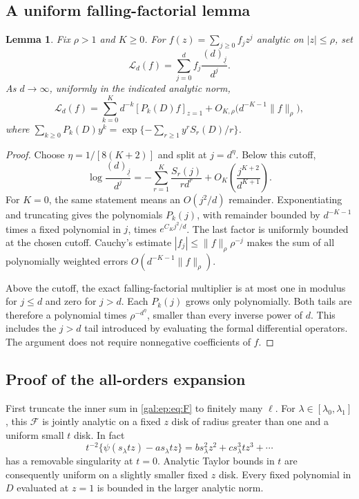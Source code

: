 \documentclass[11pt,letterpaper]{article}
\numberwithin{equation}{section}
\newtheorem{lemma}[theorem]{Lemma}
\theoremstyle{definition}\newtheorem{definition}[theorem]{Definition}
\theoremstyle{remark}\newtheorem{remark}[theorem]{Remark}
\newcommand{\fall}[2]{(#1)_{\underline{#2}}}
\begin{document}
\subsection{A uniform falling-factorial lemma}
\begin{lemma}\label{gal:ep:lem:falling}
Fix $\rho>1$ and $K\ge0$. For $f(z)=\sum_{j\ge0}f_jz^j$ analytic on $|z|\le\rho$, set
\[
\mathcal L_d(f)=\sum_{j=0}^d f_j\frac{\fall d j}{d^j}.
\]
As $d\to\infty$, uniformly in the indicated analytic norm,
\begin{equation}\label{gal:ep:eq:lemma}
\mathcal L_d(f)=\sum_{k=0}^K d^{-k}[P_k(D)f]_{z=1}
+O_{K,\rho}\bigl(d^{-K-1}\|f\|_\rho\bigr),
\end{equation}
where $\sum_{k\ge0}P_k(D)y^k=\exp\{-\sum_{r\ge1}y^rS_r(D)/r\}$.
\end{lemma}
\begin{proof}
Choose $\eta=1/[8(K+2)]$ and split at $j=d^\eta$. Below this cutoff,
\[
\log\frac{\fall d j}{d^j}
=-\sum_{r=1}^K\frac{S_r(j)}{rd^r}
+O_K\!\left(\frac{j^{K+2}}{d^{K+1}}\right).
\]
For $K=0$, the same statement means an $O(j^2/d)$ remainder. Exponentiating and truncating gives the polynomials $P_k(j)$, with remainder bounded by $d^{-K-1}$ times a fixed polynomial in $j$, times $e^{C_Kj^2/d}$. The last factor is uniformly bounded at the chosen cutoff. Cauchy's estimate $|f_j|\le\|f\|_\rho\rho^{-j}$ makes the sum of all polynomially weighted errors $O(d^{-K-1}\|f\|_\rho)$.

Above the cutoff, the exact falling-factorial multiplier is at most one in modulus for $j\le d$ and zero for $j>d$. Each $P_k(j)$ grows only polynomially. Both tails are therefore a polynomial times $\rho^{-d^\eta}$, smaller than every inverse power of $d$. This includes the $j>d$ tail introduced by evaluating the formal differential operators. The argument does not require nonnegative coefficients of $f$.
\end{proof}

\subsection{Proof of the all-orders expansion}
First truncate the inner sum in \eqref{gal:ep:eq:F} to finitely many $\ell$. For $\lambda\in[\lambda_0,\lambda_1]$, this $\mathcal F$ is jointly analytic on a fixed $z$ disk of radius greater than one and a uniform small $t$ disk. In fact
\[
t^{-2}\{\psi(s_\lambda tz)-a s_\lambda tz\}
=b s_\lambda^2z^2+c s_\lambda^3tz^3+\cdots
\]
has a removable singularity at $t=0$. Analytic Taylor bounds in $t$ are consequently uniform on a slightly smaller fixed $z$ disk. Every fixed polynomial in $D$ evaluated at $z=1$ is bounded in the larger analytic norm.
\end{document}
